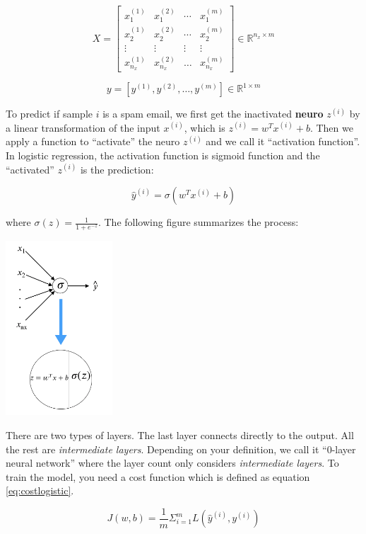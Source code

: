 \documentclass[
  12pt,
]{krantz}
\begin{document}
\begin{equation}
X=\left[\begin{array}{cccc}
x_{1}^{(1)} & x_{1}^{(2)} & \dotsb & x_{1}^{(m)}\\
x_{2}^{(1)} & x_{2}^{(2)} & \dotsb & x_{2}^{(m)}\\
\vdots & \vdots & \vdots & \vdots\\
x_{n_{x}}^{(1)} & x_{n_{x}}^{(2)} & \dots & x_{n_{x}}^{(m)}
\end{array}\right]\in\mathbb{R}^{n_{x}\times m}
\label{eq:input}
\end{equation}

\[y=[y^{(1)},y^{(2)},\dots,y^{(m)}] \in \mathbb{R}^{1 \times m}\]

To predict if sample \(i\) is a spam email, we first get the inactivated \textbf{neuro} \(z^{(i)}\) by a linear transformation of the input \(x^{(i)}\), which is \(z^{(i)}=w^Tx^{(i)} + b\). Then we apply a function to ``activate'' the neuro \(z^{(i)}\) and we call it ``activation function''. In logistic regression, the activation function is sigmoid function and the ``activated'' \(z^{(i)}\) is the prediction:

\[\hat{y}^{(i)} = \sigma(w^Tx^{(i)} + b)\]

where \(\sigma(z) = \frac{1}{1+e^{-z}}\). The following figure summarizes the process:

\includegraphics[width=0.3\textwidth,height=\textheight]{images/dnn0.png}

There are two types of layers. The last layer connects directly to the output. All the rest are \emph{intermediate layers}. Depending on your definition, we call it ``0-layer neural network'' where the layer count only considers \emph{intermediate layers}. To train the model, you need a cost function which is defined as equation \eqref{eq:costlogistic}.

\begin{equation}
J(w,b)=\frac{1}{m} \Sigma_{i=1}^m L(\hat{y}^{(i)}, y^{(i)})
\label{eq:costlogistic}
\end{equation}
\end{document}

